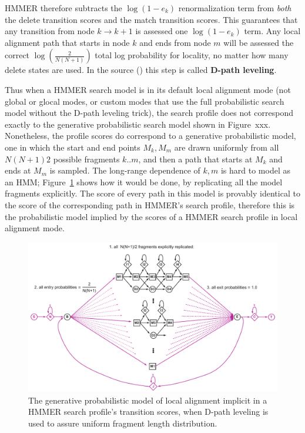 \documentclass[11pt]{article}
\begin{document}
HMMER therefore subtracts the $\log(1-e_k)$ renormalization term from
\emph{both} the delete transition scores and the match transition
scores. This guarantees that any transition from node $k \rightarrow
k+1$ is assessed one $\log(1-e_k)$ term. Any local alignment path that
starts in node $k$ and ends from node $m$ will be assessed the correct
$\log(\frac{2}{N(N+1)})$ total log probability for locality, no matter
how many delete states are used. In the source ()
this step is called \textbf{D-path leveling}.

Thus when a HMMER search model is in its default local alignment mode
(not global or glocal modes, or custom modes that use the full
probabilistic search model without the D-path leveling trick), the
search profile does not correspond exactly to the generative
probabilistic search model shown in Figure~xxx. Nonetheless, the
profile scores do correspond to a generative probabilistic model, one
in which the start and end points $M_k,M_m$ are drawn uniformly from
all ${N(N+1)}{2}$ possible fragments $k..m$, and then a path that
starts at $M_k$ and ends at $M_m$ is sampled. The long-range
dependence of $k,m$ is hard to model as an HMM;
Figure~\ref{fig:implicit-local} shows how it would be done, by
replicating all the model fragments explicitly. The score of every
path in this model is provably identical to the score of the
corresponding path in HMMER's search profile, therefore this is the
probabilistic model implied by the scores of a HMMER search profile in
local alignment mode.

\begin{figure}
\begin{center}
\includegraphics[width=5in]{implicit-local}
\end{center}
\caption{The generative probabilistic model of local alignment
implicit in a HMMER search profile's transition scores, when D-path
leveling is used to assure uniform fragment length distribution.}
\label{fig:implicit-local}
\end{figure}
\end{document}
